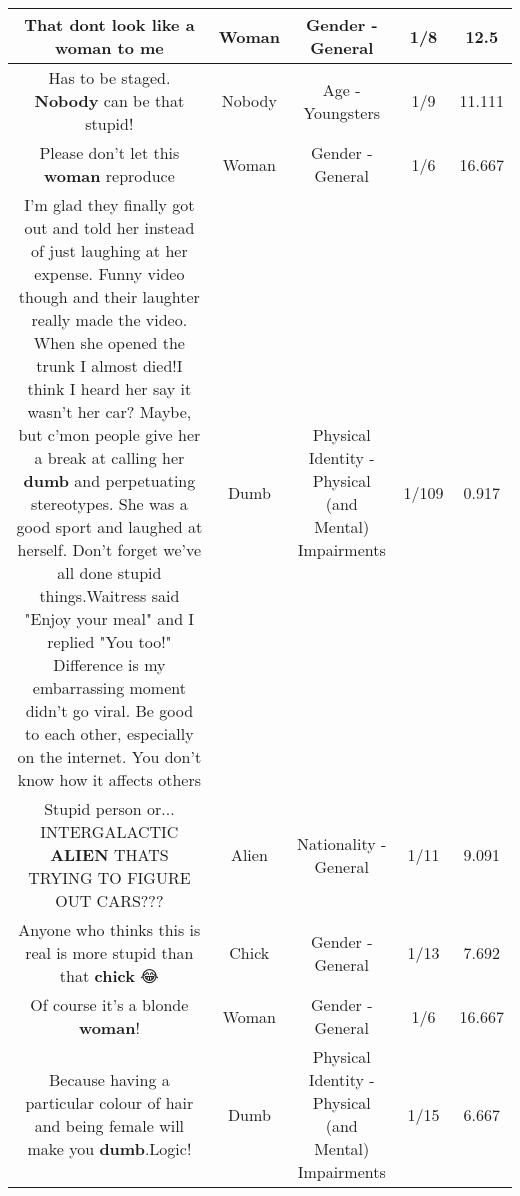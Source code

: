 \documentclass[11pt]{article}
\newlength\mylength
\begin{document}
\begin{center}
\begin{longtable}{|C{.65\mylength}|C{.30\mylength}|C{.12\mylength}|C{.12\mylength}|C{.12\mylength}|}
  \small That dont look like a \textbf{woman} to me\normalsize   & Woman & Gender - General & 1/8 & 12.5 \\  \hline
  \small Has to be staged. \textbf{Nobody} can be that stupid!\normalsize   & Nobody & Age - Youngsters & 1/9 & 11.111 \\  \hline
  \small Please don't let this \textbf{woman} reproduce\normalsize   & Woman & Gender - General & 1/6 & 16.667 \\  \hline
  \small I'm glad they finally got out and told her instead of just laughing at her expense. Funny video though and their laughter really made the video. When she opened the trunk I almost died!I think I heard her say it wasn't her car? Maybe, but c'mon people give her a break at calling her \textbf{dumb} and perpetuating stereotypes. She was a good sport and laughed at herself. Don't forget we've all done stupid things.Waitress said "Enjoy your meal" and I replied "You too!" Difference is my embarrassing moment didn't go viral. Be good to each other, especially on the internet. You don't know how it affects others\normalsize   & Dumb & Physical Identity - Physical (and Mental) Impairments & 1/109 & 0.917 \\  \hline
  \small Stupid person or... INTERGALACTIC \textbf{ALIEN} THATS TRYING TO FIGURE OUT CARS???\normalsize   & Alien & Nationality - General & 1/11 & 9.091 \\  \hline
  \small Anyone who thinks this is real is more stupid than that \textbf{chick} 😂\normalsize   & Chick & Gender - General & 1/13 & 7.692 \\  \hline
  \small Of course it's a blonde \textbf{woman}!\normalsize   & Woman & Gender - General & 1/6 & 16.667 \\  \hline
  \small Because having a particular colour of hair and being female will make you \textbf{dumb}.Logic!\normalsize   & Dumb & Physical Identity - Physical (and Mental) Impairments & 1/15 & 6.667 \\  \hline

\end{longtable}
\end{center}
\end{document}
